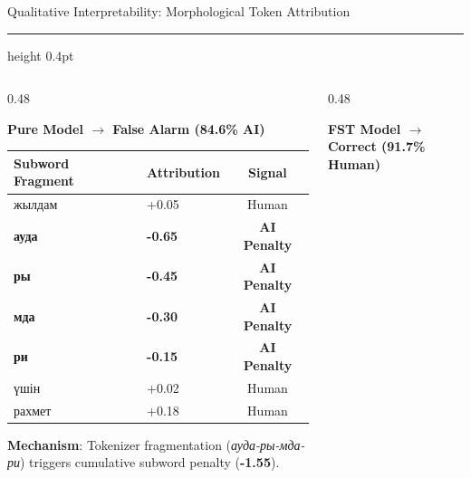 \documentclass[aspectratio=169, 10pt]{beamer}
\newcommand{\subhead}[1]{{\normalsize\textbf{\color{DarkNavy}#1}\par\vspace{3pt}}}
\begin{document}
\begin{frame}{Qualitative Interpretability: Morphological Token Attribution}
    \par\vspace{3pt}
    {\color{BorderGray}\hrule height 0.4pt}\par\vspace{4pt}
    \begin{columns}[T]
        \begin{column}{0.48\textwidth}
            \subhead{Pure Model $\to$ False Alarm (84.6\% AI)}
            \vspace{2pt}
            {\footnotesize\setlength{\tabcolsep}{3pt}
            \begin{tabular*}{\linewidth}{@{\extracolsep{\fill}}llc}
                \toprule
                \textbf{Subword Fragment} & \textbf{Attribution} & \textbf{Signal} \\
                \midrule
                жылдам & +0.05 & Human \\
                \rowcolor{red!10} \textbf{ауда} & \textbf{-0.65} & \textbf{AI Penalty} \\
                \rowcolor{red!10} \textbf{ры} & \textbf{-0.45} & \textbf{AI Penalty} \\
                \rowcolor{red!10} \textbf{мда} & \textbf{-0.30} & \textbf{AI Penalty} \\
                \rowcolor{red!10} \textbf{ри} & \textbf{-0.15} & \textbf{AI Penalty} \\
                үшін & +0.02 & Human \\
                рахмет & +0.18 & Human \\
                \bottomrule
            \end{tabular*}}
            \vspace{3pt}
            {\scriptsize\color{SlateText}\textbf{Mechanism}: Tokenizer fragmentation (\textit{ауда-ры-мда-ри}) triggers cumulative subword penalty (\textbf{-1.55}).\par}
        \end{column}
        \begin{column}{0.48\textwidth}
            \subhead{FST Model $\to$ Correct (91.7\% Human)}
            \vspace{2pt}

\end{column}
\end{columns}
\end{frame}
\end{document}
